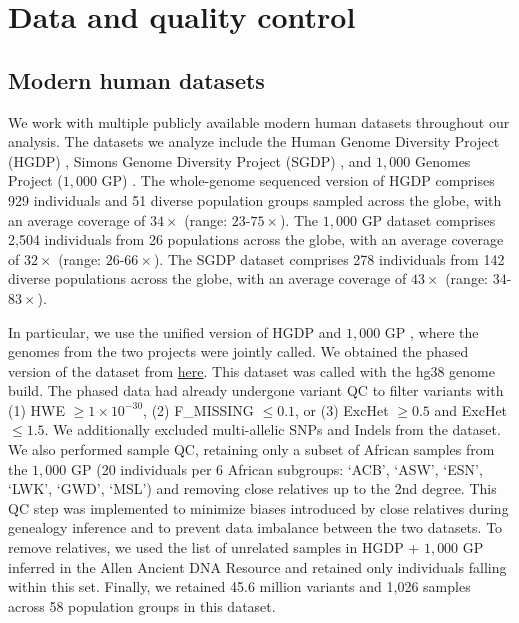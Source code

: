 \section{Data and quality control}
\label{sec:ch2-gb-data}
\subsection{Modern human datasets}

We work with multiple publicly available modern human datasets throughout our analysis. The datasets we analyze include the Human Genome Diversity Project (HGDP) \cite{cann2002human, bergstrom2020insights}, Simons Genome Diversity Project (SGDP) \cite{mallick2016simons}, and $1{,}000$ Genomes Project ($1{,}000$ GP) \cite{sudmant2015integrated, 10002015global}.
%
The whole-genome sequenced version of HGDP \cite{bergstrom2020insights} comprises 929 individuals and 51 diverse population groups sampled across the globe, with an average coverage of $34 \times$ (range: $23$-$75 \times$).
%
The $1{,}000$ GP dataset comprises 2,504 individuals from 26 populations across the globe, with an average coverage of $32 \times$ (range: $26$-$66 \times$).
%
The SGDP dataset comprises 278 individuals from 142 diverse populations across the globe, with an average coverage of $43 \times$ (range: $34$-$83 \times$).

In particular, we use the unified version of HGDP and $1{,}000$ GP \cite{koenig2024harmonized}, where the genomes from the two projects were jointly called.
%
We obtained the phased version of the dataset from \href{gs://gcp-public-data‐‐gnomad/resources/hgdp_1kg/phased_haplotypes_v2/}{here}. This dataset was called with the hg38 genome build.
%
The phased data had already undergone variant QC to filter variants with (1) HWE $\geq 1 \times 10^{-30}$, (2) F\_MISSING $\leq 0.1$, or (3) ExcHet $\geq 0.5$ and ExcHet $\leq 1.5$.
%
We additionally excluded multi-allelic SNPs and Indels from the dataset.
%
We also performed sample QC, retaining only a subset of African samples from the $1{,}000$ GP (20 individuals per 6 African subgroups: `ACB', `ASW', `ESN', `LWK', `GWD', `MSL') and removing close relatives up to the 2nd degree.
%
This QC step was implemented to minimize biases introduced by close relatives during genealogy inference and to prevent data imbalance between the two datasets.
%
To remove relatives, we used the list of unrelated samples in HGDP + $1{,}000$ GP inferred in the Allen Ancient DNA Resource \cite{mallick2024allen} and retained only individuals falling within this set.
%
Finally, we retained 45.6 million variants and 1,026 samples across 58 population groups in this dataset.

